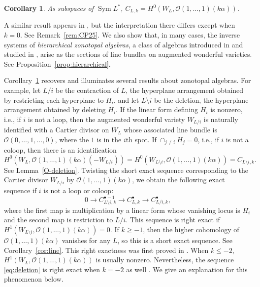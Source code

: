 \documentclass{amsart}
\newtheorem{corollary}[theorem]{Corollary}
\theoremstyle{definition}
\begin{document}
\begin{corollary}\label{cor:seczonotope}
As subspaces of $\operatorname{Sym}L^*$, $C_{L,k} = H^0(W_L, \mathcal{O}(1, \dotsc, 1)(k\alpha))$. 
\end{corollary}

A similar result appears in \cite{GeoZonotopeII}, but the interpretation there differs except when $k=0$. See Remark~\ref{rem:CP25}. We also show that, in many cases, the inverse systems of \emph{hierarchical zonotopal algebras}, a class of algebras introduced in \cite{HoltzRonXu} and studied in \cite{LenzHierarchical}, arise as the sections of line bundles on augmented wonderful varieties. See Proposition~\ref{prop:hierarchical}. 

Corollary~\ref{cor:seczonotope} recovers and illuminates several results about zonotopal algebras. For example, let $L/i$ be the contraction of $L$, the hyperplane arrangement obtained by restricting each hyperplane to $H_i$, and let $L \setminus i$ be the deletion, the hyperplane arrangement obtained by deleting $H_i$. 
If the linear form defining $H_i$ is nonzero, i.e., if $i$ is not a loop, then the augmented wonderful variety $W_{L/i}$ is naturally identified with a Cartier divisor on $W_L$ whose associated line bundle is $\mathcal{O}(0, \dotsc, 1, \dotsc, 0)$, where the $1$ is in the $i$th spot. If $\cap_{j \not= i} H_j = 0$, i.e., if $i$ is not a coloop, then there is an identification 
\begin{equation}\label{eq:deletionidentification}
H^0(W_L, \mathcal{O}(1, \dotsc, 1)(k\alpha)(-W_{L/i})) = H^0(W_{L \setminus i}, \mathcal{O}(1, \dotsc, 1)(k\alpha)) = C_{L \setminus i, k}.
\end{equation}
See Lemma~\ref{O-deletion}. Twisting the short exact sequence corresponding to the Cartier divisor $W_{L/i}$ by $\mathcal{O}(1, \dotsc, 1)(k\alpha)$, we obtain the following exact sequence if $i$ is not a loop or coloop:
\begin{equation}\label{eq:deletion}
0 \to C_{L \setminus i, k}^{\bullet - 1} \to C_{L, k}^{\bullet} \to C_{L/i, k}^{\bullet},
\end{equation}
where the first map is multiplication by a linear form whose vanishing locus is $H_i$ and the second map is restriction to $L/i$. 
This sequence is right exact if $H^1(W_{L \setminus i}, \mathcal{O}(1, \dotsc, 1)(k\alpha)) = 0$. 
If $k \ge -1$, then the higher cohomology of $\mathcal{O}(1, \dotsc, 1)(k\alpha)$ vanishes for any $L$, so this is a short exact sequence. See Corollary~\ref{cor:line}. This right exactness was first proved in \cite[Proposition 4.4]{ArdilaPostnikov}. When $k \le -2$, $H^1(W_L, \mathcal{O}(1, \dotsc, 1)(k\alpha))$ is usually nonzero. Nevertheless, the sequence \eqref{eq:deletion} is right exact when $k= -2$ as well \cite[Section 5.1]{HoltzRon}. We give an explanation for this phenomenon below. 
\end{document}
